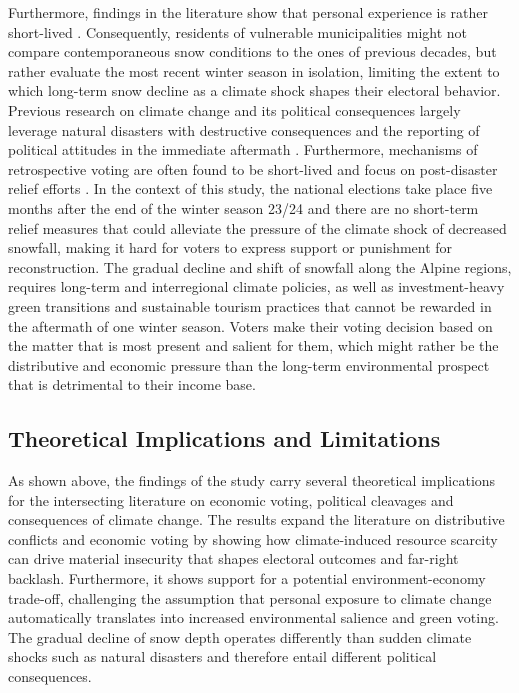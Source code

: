 \documentclass{article}
\begin{document}
Furthermore, findings in the literature show that personal experience is rather short-lived \parencite{HEALY2009, egan2012}. Consequently, residents of vulnerable municipalities might not compare contemporaneous snow conditions to the ones of previous decades, but rather evaluate the most recent winter season in isolation, limiting the extent to which long-term snow decline as a climate shock shapes their electoral behavior.
Previous research on climate change and its political consequences largely leverage natural disasters with destructive consequences and the reporting of political attitudes in the immediate aftermath \parencite{egan2012, baccini2021, Masiero2021, TaheriHosseinkhani2026}. Furthermore, mechanisms of retrospective voting are often found to be short-lived and focus on post-disaster relief efforts \parencite{HEALY2009}. In the context of this study, the national elections take place five months after the end of the winter season 23/24 and there are no short-term relief measures that could alleviate the pressure of the climate shock of decreased snowfall, making it hard for voters to express support or punishment for reconstruction. The gradual decline and shift of snowfall along the Alpine regions, requires long-term and interregional climate policies, as well as investment-heavy green transitions and sustainable tourism practices that cannot be rewarded in the aftermath of one winter season. Voters make their voting decision based on the matter that is most present and salient for them, which might rather be the distributive and economic pressure than the long-term environmental prospect that is detrimental to their income base.


\subsection{Theoretical Implications and Limitations}
As shown above, the findings of the study carry several theoretical implications for the intersecting literature on economic voting, political cleavages and consequences of climate change. The results expand the literature on distributive conflicts and economic voting by showing how climate-induced resource scarcity can drive material insecurity that shapes electoral outcomes and far-right backlash. Furthermore, it shows support for a potential environment-economy trade-off, challenging the assumption that personal exposure to climate change automatically translates into increased environmental salience and green voting. The gradual decline of snow depth operates differently than sudden climate shocks such as natural disasters and therefore entail different political consequences. 
\end{document}
